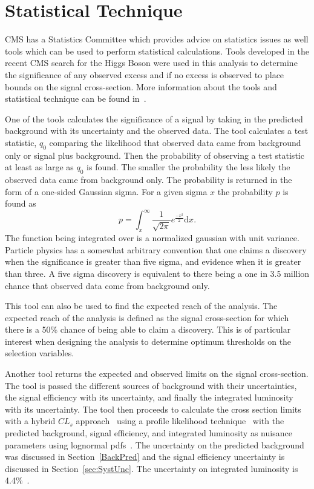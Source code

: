 \section{Statistical Technique \label{sec:stats}}
CMS has a Statistics Committee which provides advice on statistics issues as well tools which can be used to perform statistical calculations.
Tools developed in the recent CMS search for the Higgs Boson were used
in this analysis to determine the significance of any observed excess and if no excess is observed to place bounds on the signal cross-section.
More information about the tools and statistical technique can be found in~\cite{Chatrchyan:2013lba}.

One of the tools calculates the significance of a signal by taking in the predicted background with its uncertainty and the observed data.
The tool calculates a test statistic, $q_0$ comparing the likelihood that observed data came from background only or signal plus background.
Then the probability of observing a test statistic at least as large as $q_0$ is found.
The smaller the probability the less likely the observed data came from background only.
The probability is returned in the form of a one-sided Gaussian sigma. For a given sigma $x$ the probability $p$ is found as
\begin{equation}
p = \int_x^{\infty} \frac{1}{\sqrt{2\pi}}e^{\frac{-x^2}{2}} \mathrm{d} x.
\label{eq:sigma}
\end{equation}
The function being integrated over is a normalized gaussian with unit variance. Particle physics has a somewhat arbitrary 
convention that one claims a discovery when the significance
is greater than five sigma, and evidence when it is greater than three. A five sigma discovery is equivalent to there being a one in 3.5 million chance that
observed data come from background only.

This tool can also be used to find the expected reach of the analysis. The expected reach of the analysis is defined as the signal cross-section
for which there is a 50\% chance of being able to claim a discovery.
This is of particular interest when designing the analysis to determine optimum thresholds on the selection variables.

Another tool returns the expected and observed limits on the signal cross-section. The tool is passed the different sources of background with their uncertainties,
the signal efficiency with its uncertainty, and finally the integrated luminosity with its uncertainty. The tool then proceeds to calculate the cross section limits with
a hybrid $CL_s$ approach~\cite{Read:451614} using a profile likelihood technique~\cite{Cowan:2010js} with the predicted background, signal efficiency, and integrated luminosity
as nuisance parameters using lognormal pdfs~\cite{Eadie,James}. The uncertainty on the predicted background was discussed in Section~\ref{BackPred} and the
signal efficiency uncertainty is discussed in Section~\ref{sec:SystUnc}. The uncertainty on integrated luminosity is 4.4\%~\cite{SMP-12-008}.